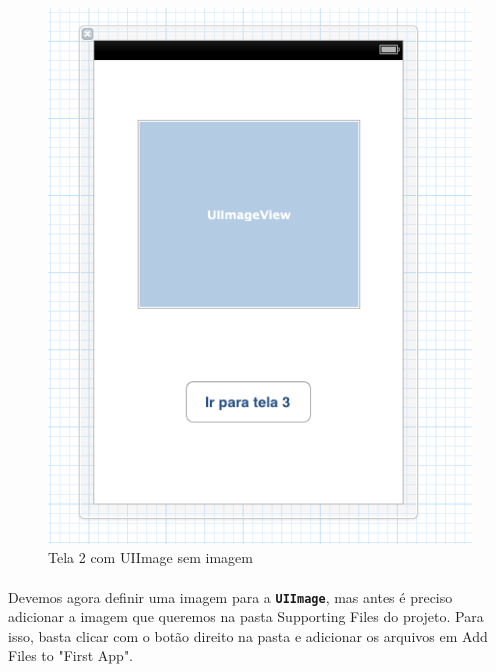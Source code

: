 \documentclass[a4paper,12pt,brazil,doubleside]{book}
\begin{document}
\begin{figure}[h]
  \centering
  \includegraphics[totalheight=0.25\textheight]{../figuras/ios/2/xib_tela2.png}
  \caption{Tela 2 com UIImage sem imagem}
  \label{fig:a}
\end{figure}

\bigskip

\paragraph{}Devemos agora definir uma imagem para a \texttt{\textbf{UIImage}}, mas antes é preciso adicionar a imagem que queremos na pasta Supporting Files do projeto. Para isso, basta clicar com o botão direito na pasta e adicionar os arquivos em Add Files to "First App".
\end{document}
